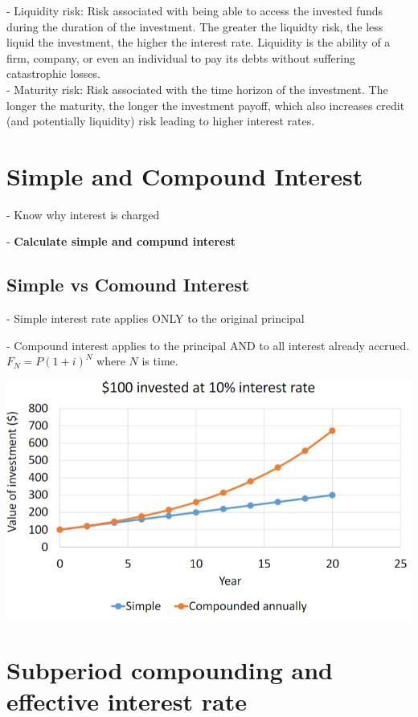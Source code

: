 \documentclass{article}
\begin{document}
- Liquidity risk: Risk associated with being able to access the invested funds during the duration of the investment. The greater the liquidty risk, the less liquid the investment, the higher the interest rate.
Liquidity is the ability of a firm, company, or even an individual to pay its debts without suffering catastrophic losses.\\

- Maturity risk: Risk associated with the time horizon of the investment. The longer the maturity, the longer the investment payoff, which also increases credit (and potentially liquidity) risk leading to higher interest rates.\\

\section*{Simple and Compound Interest}
- Know why interest is charged

- \textbf{Calculate simple and compund interest}

\subsection*{Simple vs Comound Interest}

- Simple interest rate applies ONLY to the original principal

- Compound interest applies to the principal AND to all interest already accrued. $F_N = P(1+i)^N$ where $N$ is time.\\
\begin{center}
    \includegraphics[width=0.8\linewidth]{W1V2.png}
\end{center}

\section*{Subperiod compounding and effective interest rate}
\end{document}
